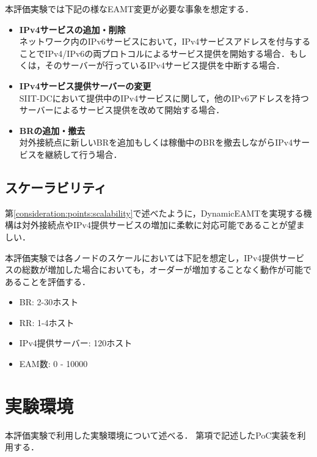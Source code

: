 本評価実験では下記の様なEAMT変更が必要な事象を想定する．

\begin{itemize}
    \item \textbf{IPv4サービスの追加・削除} \\
    ネットワーク内のIPv6サービスにおいて，IPv4サービスアドレスを付与することでIPv4/IPv6の両プロトコルによるサービス提供を開始する場合．もしくは，そのサーバーが行っているIPv4サービス提供を中断する場合．
    \item \textbf{IPv4サービス提供サーバーの変更} \\
    SIIT-DCにおいて提供中のIPv4サービスに関して，他のIPv6アドレスを持つサーバーによるサービス提供を改めて開始する場合．
    \item \textbf{BRの追加・撤去} \\ 
    対外接続点に新しいBRを追加もしくは稼働中のBRを撤去しながらIPv4サービスを継続して行う場合．
\end{itemize}


\subsection{スケーラビリティ}
第\ref{consideration:points:scalability}で述べたように，DynamicEAMTを実現する機構は対外接続点やIPv4提供サービスの増加に柔軟に対応可能であることが望ましい．

本評価実験では各ノードのスケールにおいては下記を想定し，IPv4提供サービスの総数が増加した場合においても，オーダーが増加することなく動作が可能であることを評価する．

\begin{itemize}
    \item BR: 2-30ホスト 
    \item RR: 1-4ホスト 
    \item IPv4提供サーバー: 120ホスト
    \item EAM数: 0 - 10000
\end{itemize}


\section{実験環境}
本評価実験で利用した実験環境について述べる．
第\label{implementation:poc}項で記述したPoC実装を利用する．

